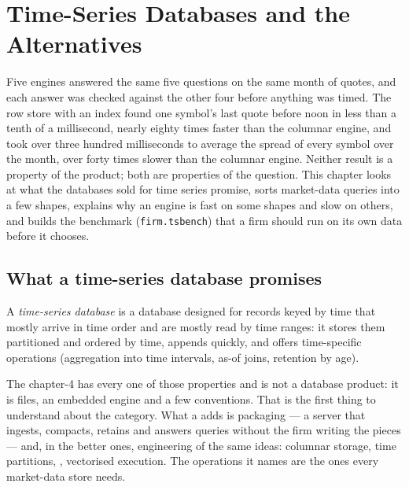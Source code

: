 \chapter{Time-Series Databases and the Alternatives}\label{ch:pl:time-series-databases-and-the-alternatives}

Five engines answered the same five questions on the same month of quotes, and each answer was checked against the other four
before anything was timed. The row store with an index found one symbol's last quote before noon in less than a tenth of a
millisecond, nearly eighty times faster than the columnar engine, and took over three hundred milliseconds to average the
spread of every symbol over the month, over forty times slower than the columnar engine. Neither result is a property of the product; both are
properties of the question. This chapter looks at what the databases sold for time series promise, sorts market-data queries
into a few shapes, explains why an engine is fast on some shapes and slow on others, and builds the benchmark
(\texttt{firm.tsbench}) that a firm should run on its own data before it chooses.

\section{What a time-series database promises}

\begin{definition}\label{def:pl:time-series-databases-and-the-alternatives:tsdb}
A \emph{time-series database} is a database designed for records keyed by time that mostly arrive
in time order and are mostly read by time ranges: it stores them partitioned and ordered by time, appends quickly, and offers
time-specific operations (aggregation into time intervals, as-of joins, retention by age).
\end{definition}

The chapter-4  has every one of those properties and is not a database product: it is files, an embedded engine and
a few conventions. That is the first thing to understand about the category. What a  adds is packaging ---
a server that ingests, compacts, retains and answers queries without the firm writing the pieces --- and, in the better ones,
engineering of the same ideas: columnar storage, time partitions, , vectorised execution. The operations it names are
the ones every market-data store needs.

